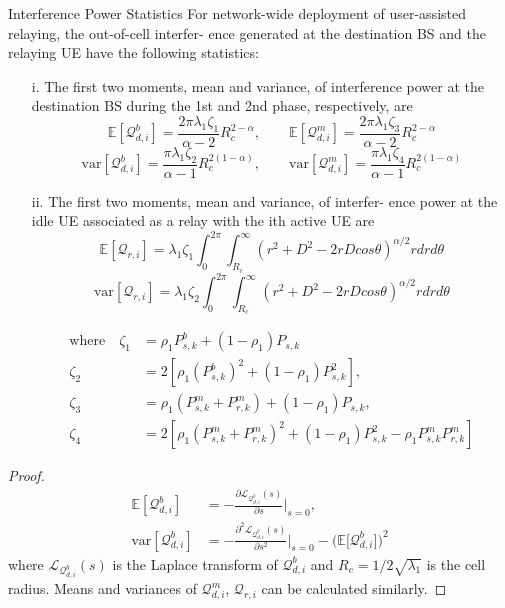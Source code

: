 \begin{theorem}{Interference Power Statistics} \label{theorem:theorem2}
For network-wide
deployment of user-assisted relaying, the out-of-cell interfer-
ence generated at the destination BS and the relaying UE have
the following statistics:

\begin{itemize}
\item[i.] 
The first two moments, mean and variance, of interference
power at the destination BS during the 1st and 2nd phase,
respectively, are
\begin{equation}
\mathbb{E}[\mathcal{Q}_{d,i}^b] = \frac{2\pi\lambda_1\zeta_1}{\alpha-2}R_c^{2-\alpha}, \qquad \mathbb{E}[\mathcal{Q}_{d,i}^m] = \frac{2\pi\lambda_1\zeta_3}{\alpha-2}R_c^{2-\alpha}
\end{equation}
\begin{equation}
\text{var}[\mathcal{Q}_{d,i}^b] = \frac{\pi\lambda_1\zeta_2}{\alpha-1}R_c^{2(1-\alpha)}, \qquad \text{var}[\mathcal{Q}_{d,i}^m] = \frac{\pi\lambda_1\zeta_4}{\alpha-1}R_c^{2(1-\alpha)}
\end{equation}

\item[ii.]
The first two moments, mean and variance, of interfer-
ence power at the idle UE associated as a relay with the ith
active UE are
\begin{equation}
\mathbb{E}[\mathcal{Q}_{r,i}] = \lambda_1\zeta_1 \int_0^{2\pi}\int_{R_c}^\infty (r^2+D^2-2rDcos\theta)^{\alpha/2}rdrd\theta
\end{equation}
\begin{equation}
\text{var}[\mathcal{Q}_{r,i}] = \lambda_1\zeta_2 \int_0^{2\pi}\int_{R_c}^\infty (r^2+D^2-2rDcos\theta)^{\alpha/2}rdrd\theta
\end{equation}

\begin{align} \label{eq:zeta1}
\text{where} \quad  \zeta_1 &= \rho_1 P_{s,k}^b +(1-\rho_1)P_{s,k} \\
                \zeta_2 &= 2[\rho_1(P_{s,k}^b)^2 + (1-\rho_1)P_{s,k}^2],\\
                \zeta_3 &= \rho_1 (P_{s,k}^m+P_{r,k}^m) +(1-\rho_1)P_{s,k}, \\
                \zeta_4 &= 2[\rho_1(P_{s,k}^m+P_{r,k}^m)^2 + (1-\rho_1)P_{s,k}^2 -\rho_1P_{s,k}^mP_{r,k}^m] \label{eq:zeta4}
\end{align}
\end{itemize}
\end{theorem}
\begin{proof}
\begin{align*}
\mathbb{E}[\mathcal{Q}_{d,i}^b] &= -\frac{\partial\mathcal{L}_{\mathcal{Q}_{d,i}^b}(s)}{\partial s}\bigg\rvert_{s=0}, \\
\text{var}[\mathcal{Q}_{d,i}^b] &= -\frac{\partial^2\mathcal{L}_{\mathcal{Q}_{d,i}^b}(s)}{\partial s^2}\bigg\rvert_{s=0} - \Big(\mathbb{E}\big[\mathcal{Q}_{d,i}^b \big] \Big)^2
\end{align*}
where $\mathcal{L}_{\mathcal{Q}_{d,i}^b}(s)$ is the Laplace transform of $\mathcal{Q}_{d,i}^b$ and $R_c = 1/2\sqrt{\lambda_1}$ is the cell radius. Means and variances of $\mathcal{Q}_{d,i}^m$, $\mathcal{Q}_{r,i}$ can be calculated similarly.
\end{proof}
